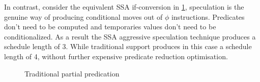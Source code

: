 In contrast, consider the equivalent SSA if-conversion in \ref{fig:nest_ssa}, speculation is the genuine way of producing conditional moves out of $\phi$ instructions. Predicates don't need to be computed and temporaries values don't need to be conditionalized. As a result the SSA aggressive speculation technique produces a schedule length of 3. While traditional support produces in this case a schedule length of 4, without further expensive predicate reduction optimisation.

\begin{figure}
\centering
\caption{Traditional partial predication}
\label{fig:nest_ssa}
\end{figure}

